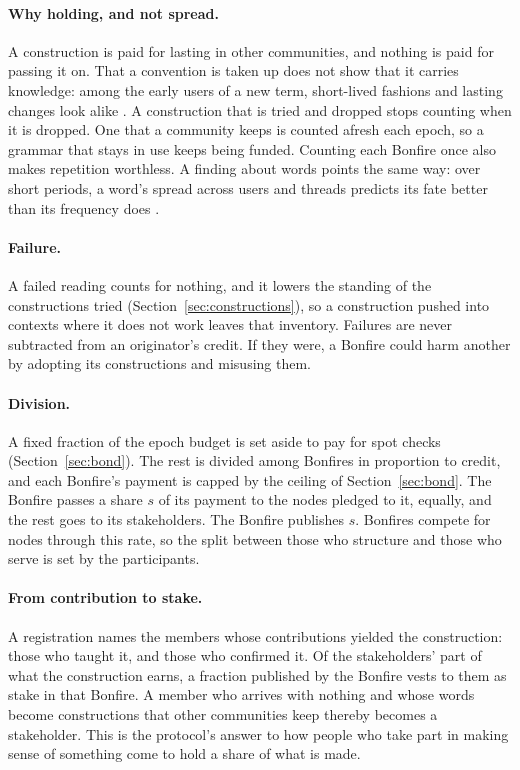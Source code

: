 \paragraph{Why holding, and not spread.} A construction is paid for lasting in other communities, and nothing is
paid for passing it on. That a convention is taken up does not show that it carries knowledge: among the early
users of a new term, short-lived fashions and lasting changes look alike \citep{tarrade2024position}. A construction that is tried and dropped stops counting when it is dropped. One that a
community keeps is counted afresh each epoch, so a grammar that stays in use keeps being funded. Counting each
Bonfire once also makes repetition worthless. A finding about words points the same way: over short periods, a
word's spread across users and threads predicts its fate better than its frequency does
\citep{altmann2011niche}.

\paragraph{Failure.} A failed reading counts for nothing, and it lowers the standing of the constructions tried
(Section~\ref{sec:constructions}), so a construction pushed into contexts where it does not work leaves that
inventory. Failures are never subtracted from an originator's credit. If they were, a Bonfire could harm another
by adopting its constructions and misusing them.

\paragraph{Division.} A fixed fraction of the epoch budget is set aside to pay for spot checks
(Section~\ref{sec:bond}). The rest is divided among Bonfires in proportion to credit, and each Bonfire's payment is
capped by the ceiling of Section~\ref{sec:bond}. The Bonfire passes a share $s$ of its payment to the nodes pledged
to it, equally, and the rest goes to its stakeholders. The Bonfire publishes $s$. Bonfires compete for nodes
through this rate, so the split between those who structure and those who serve is set by the participants.

\paragraph{From contribution to stake.} A registration names the members whose contributions yielded the
construction: those who taught it, and those who confirmed it. Of the stakeholders' part of what the construction earns, a fraction published by the Bonfire vests to them
as stake in that Bonfire. A member who arrives with nothing and whose words become
constructions that other communities keep thereby becomes a stakeholder. This is the protocol's answer to how
people who take part in making sense of something come to hold a share of what is made.

